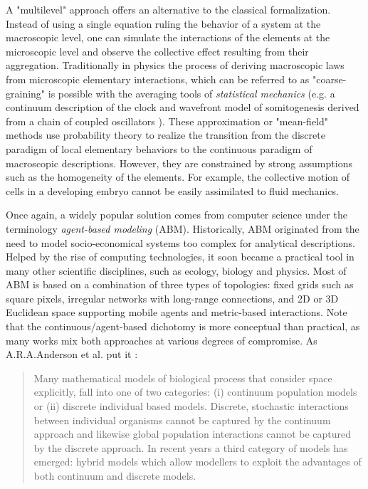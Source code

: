  A "multilevel" approach offers an alternative to the classical formalization. Instead of using a single equation ruling the behavior of a system at the macroscopic level, one can simulate the interactions of the elements at the microscopic level and observe the collective effect resulting from their aggregation. Traditionally in physics the process of deriving macroscopic laws from microscopic elementary interactions, which can be referred to as "coarse-graining" is possible with the averaging tools of \textit{statistical mechanics} (e.g. a continuum description of the clock and wavefront model of somitogenesis derived from a chain of coupled oscillators \cite{Murray:2011cy}). These approximation or "mean-field" methods use probability theory to realize the transition from the discrete paradigm of local elementary behaviors to the continuous paradigm of macroscopic descriptions. However, they are constrained by strong assumptions such as the homogeneity of the elements. For example, the collective motion of cells in a developing embryo cannot be easily assimilated to fluid mechanics.  

  Once again, a widely popular solution comes from computer science under the terminology \textit{agent-based modeling} (ABM). Historically, ABM originated from the need to model socio-economical systems too complex for analytical descriptions. Helped by the rise of computing technologies, it soon became a practical tool in many other scientific disciplines, such as ecology, biology and physics. Most of ABM is based on a combination of three types of topologies: fixed grids such as square pixels, irregular networks with long-range connections, and 2D or 3D Euclidean space supporting mobile agents and metric-based interactions. Note that the continuous/agent-based dichotomy is more conceptual than practical, as many works mix both approaches at various degrees of compromise. As A.R.A.Anderson et al. put it \cite{Anderson:2007wp}:  
\begin{quotation}  Many mathematical models of biological process that consider space explicitly, fall into one of two categories: (i) continuum population models or (ii) discrete individual based models. Discrete, stochastic interactions between individual organisms cannot be captured by the continuum approach and likewise global population interactions cannot be captured by the discrete approach. In recent years a third category of models has emerged: hybrid models which allow modellers to exploit the advantages of both continuum and discrete models.  
\end{quotation}

